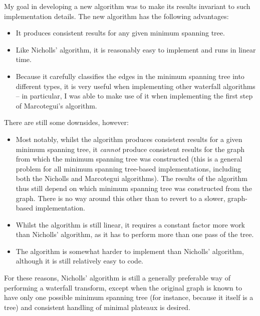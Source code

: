 My goal in developing a new algorithm was to make its results invariant to such implementation details. The new algorithm has the following advantages:
%
\begin{itemize}
\item It produces consistent results for any given minimum spanning tree.
\item Like Nicholls' algorithm, it is reasonably easy to implement and runs in linear time.
\item Because it carefully classifies the edges in the minimum spanning tree into different types, it is very useful when implementing other waterfall algorithms -- in particular, I was able to make use of it when implementing the first step of Marcotegui's algorithm.
\end{itemize}
%
There are still some downsides, however:
%
\begin{itemize}
\item Most notably, whilst the algorithm produces consistent results for a given minimum spanning tree, it \emph{cannot} produce consistent results for the graph from which the minimum spanning tree was constructed (this is a general problem for all minimum spanning tree-based implementations, including both the Nicholls and Marcotegui algorithms). The results of the algorithm thus still depend on which minimum spanning tree was constructed from the graph. There is no way around this other than to revert to a slower, graph-based implementation.
\item Whilst the algorithm is still linear, it requires a constant factor more work than Nicholls' algorithm, as it has to perform more than one pass of the tree.
\item The algorithm is somewhat harder to implement than Nicholls' algorithm, although it is still relatively easy to code.
\end{itemize}
%
For these reasons, Nicholls' algorithm is still a generally preferable way of performing a waterfall transform, except when the original graph is known to have only one possible minimum spanning tree (for instance, because it itself is a tree) and consistent handling of minimal plateaux is desired.

\iffalse
# Based on Chris's work
+ Produces results that do not depend on the implementation of key data structures (like Marcotegui's) or where the MST is rooted (like Chris's)
+ Efficient, linear-time algorithm
+ Useful as a first step in other waterfall algorithms, because it carefully pins down the types of different edges
+ Easy to implement
- Produces results that depend on which MST is constructed (all MST-based algorithms, including Chris's, necessarily do this -- the only alternative is to run the waterfall on a graph and accept that it will be slower)
- Requires a constant factor more work than Chris's
- Not as easy to implement as Chris's
- The 'incorrect' version of Chris's actually produces better results than either this one or Chris's 'correct' version(!)
\fi

